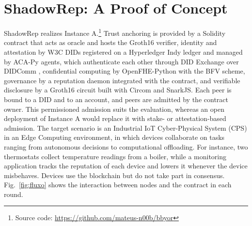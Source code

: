 \documentclass[conference]{IEEEtran}
\begin{document}
\section{ShadowRep: A Proof of Concept}\label{sec:poc}
ShadowRep realizes Instance A.\footnote{Source code: \url{https://github.com/mateus-n00b/bbyor}} Trust anchoring is provided by a Solidity contract that acts as oracle and hosts the Groth16 verifier, identity and attestation by W3C DIDs registered on a Hyperledger Indy ledger and managed by ACA-Py agents, which authenticate each other through DID Exchange over DIDComm \cite{hardman2019aries}, confidential computing by OpenFHE-Python \cite{openfhe2022} with the BFV scheme, governance by a reputation daemon integrated with the contract, and verifiable disclosure by a Groth16 circuit built with Circom and SnarkJS. Each peer is bound to a DID and to an account, and peers are admitted by the contract owner. This permissioned admission suits the evaluation, whereas an open deployment of Instance A would replace it with stake- or attestation-based admission. The target scenario is an Industrial IoT Cyber-Physical System (CPS) \cite{chang2013trust} in an Edge Computing environment, in which devices collaborate on tasks ranging from autonomous decisions to computational offloading. For instance, two thermostats collect temperature readings from a boiler, while a monitoring application tracks the reputation of each device and lowers it whenever the device misbehaves. Devices use the blockchain but do not take part in consensus. Fig.~\ref{fig:fluxo} shows the interaction between nodes and the contract in each round.
\end{document}
